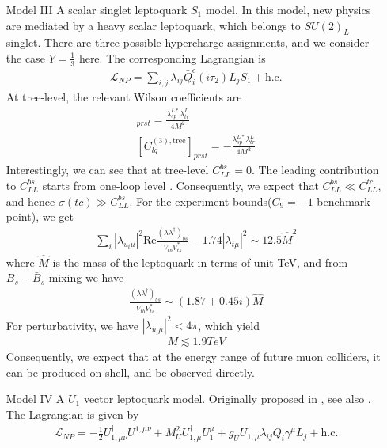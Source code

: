 \documentclass[a4paper,11pt]{article}
\begin{document}
\begin{enumerate}
    \item[Model III] A scalar singlet leptoquark $S_1$ model.
        In this model, new physics are mediated by a heavy scalar leptoquark, which belongs to $SU(2)_{L}$ singlet.
        There are three possible hypercharge assignments,
        and we consider the case $Y=\frac{1}{3}$ here.
        The corresponding Lagrangian is
        \begin{align}
            \mathcal{L}_{NP}=\sum_{i,j}\lambda_{ij}\bar{Q}^c_i(i\tau_2)L_jS_1+\textrm{h.c.}
        \end{align}
        At tree-level, the relevant Wilson coefficients are
        \begin{align}
            [C_{lq}^{(1),\textrm{tree}}]_{prst}=\frac{\lambda_{sp}^{L*}\lambda_{tr}^{L}}{4M^2}\\
            [C_{lq}^{(3),\textrm{tree}}]_{prst}=-\frac{\lambda_{sp}^{L*}\lambda_{tr}^{L}}{4M^2}
        \end{align}
        Interestingly, we can see that at tree-level $C_{LL}^{bs}=0$.
        The leading contribution to $C_{LL}^{bs}$ starts from one-loop level \cite{Bauer:2015knc}.
        Consequently, we expect that $C_{LL}^{bs}\ll C_{LL}^{tc}$,
        and hence $\sigma(tc)\gg C_{LL}^{bs}$.
        For the experiment bounds($C_9=-1$ benchmark point), we get
        \begin{align}
            \sum_{i}|\lambda_{u_i\mu}|^2\mathrm{Re}\frac{(\lambda\lambda^{\dag})_{bs}}{V_{tb}V_{ts}^{*}}-1.74|\lambda_{t\mu}|^2\sim 12.5\hat{M}^2
        \end{align}
        where $\hat{M}$ is the mass of the leptoquark in terms of unit TeV,
        and from $B_s-\bar{B}_s$ mixing we have
        \begin{align}
            \frac{(\lambda\lambda^{\dag})_{bs}}{V_{tb}V_{ts}^{*}}\sim(1.87+0.45i)\hat{M}
        \end{align}
        For perturbativity, we have $|\lambda_{u_i\mu}|^2<4\pi$, which yield
        \begin{align}
            M\lesssim 1.9\si{TeV}
        \end{align}
        Consequently, we expect that at the energy range of future muon colliders, it can be produced on-shell, and be observed directly.
\item[Model IV] A $U_1$ vector leptoquark model. Originally proposed in \cite{Barbieri:2015yvd},
see also \cite{Buttazzo:2017ixm}.
        The Lagrangian is given by
        \begin{align}
        \mathcal{L}_{NP}=-\frac{1}{2}U_{1,\mu\nu}^{\dag}U^{1,\mu\nu}+M_U^2U_{1,\mu}^{\dag}U_1^{\mu}+g_UU_{1,\mu}\lambda_{ij}\bar{Q}_{i}\gamma^{\mu}L_{j}+\textrm{h.c.}

\end{align}
\end{enumerate}
\end{document}
